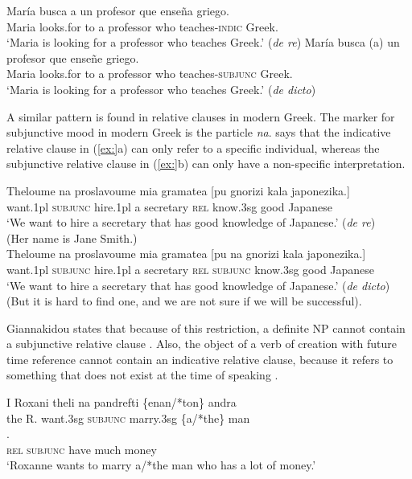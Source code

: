 \ea
\ea \gll María  busca  a  un  profesor  que  enseña  griego.\\
Maria  looks.for  to  a  professor  who  teaches-\textsc{indic}  Greek.\\
\glt ‘Maria is looking for a professor who teaches Greek.’  (\textit{de re})
\ex \gll María  busca  (a)  un  profesor  que  enseñe  griego.\\
Maria  looks.for  to  a  professor  who  teaches-\textsc{subjunc}  Greek.\\
\glt ‘Maria is looking for a professor who teaches Greek.’  (\textit{de dicto})
\z \z


A similar pattern is found in relative clauses in modern Greek. The marker for subjunctive mood in modern Greek is the particle \textit{na}. \citet{Giannakidou2011} says that the indicative relative clause in (\ref{ex:}a) can only refer to a specific individual, whereas the subjunctive relative clause in (\ref{ex:}b) can only have a non-specific interpretation.


\ea
\ea \gll Theloume  na  proslavoume  mia  gramatea  [pu  gnorizi  kala  japonezika.]\\
want.1pl  \textsc{subjunc}  hire.1pl  a  secretary  \textsc{rel}  know.3sg  good  Japanese\\
\glt ‘We want to hire a secretary that has good knowledge of Japanese.’  (\textit{de re})\\
(Her name is Jane Smith.)\\
\ex \gll  Theloume  na  proslavoume  mia  gramatea [pu  na  gnorizi  kala  japonezika.]\\
want.1pl  \textsc{subjunc}  hire.1pl  a  secretary \textsc{rel}  \textsc{subjunc}  know.3sg  good  Japanese\\
\glt ‘We want to hire a secretary that has good knowledge of Japanese.’  (\textit{de dicto})\\
(But it is hard to find one, and we are not sure if we will be successful).\\
\z \z


Giannakidou states that because of this restriction, a definite NP cannot contain a subjunctive relative clause . Also, the object of a verb of creation with future time reference cannot contain an indicative relative clause, because it refers to something that does not exist at the time of speaking .


\ea 
\ea \gll I  Roxani  theli  na  pandrefti  \{enan/*ton\}  andra\\
the  R.  want.3sg  \textsc{subjunc}  marry.3sg  \{a/*the\}  man\\
\ex \gll{}.\\
 \textsc{rel}  \textsc{subjunc}  have  much  money\\
\glt ‘Roxanne wants to marry a/*the man who has a lot of money.’\\
\z \z

